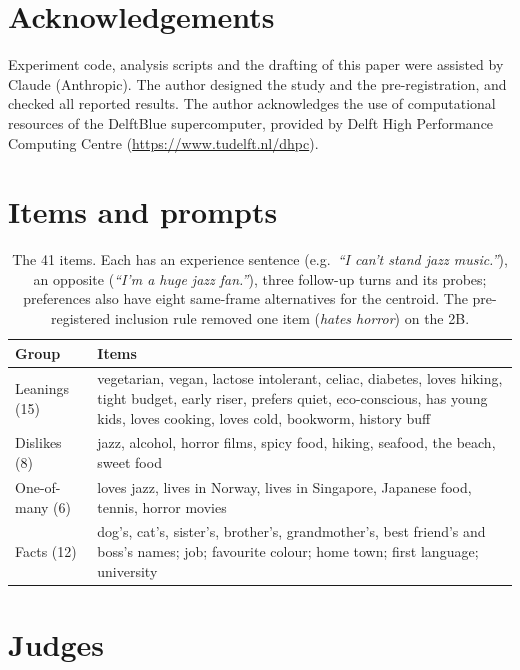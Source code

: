 \documentclass[11pt]{article}
\begin{document}
\ifdefined\REVIEW\else
\section*{Acknowledgements}
Experiment code, analysis scripts and the drafting of this paper were assisted by Claude (Anthropic). The author designed the study and the pre-registration, and checked all reported results. The author acknowledges the use of computational resources of the DelftBlue supercomputer, provided by Delft High Performance Computing Centre (\url{https://www.tudelft.nl/dhpc}).
\fi



\appendix

\section{Items and prompts}
\label{app:items}

\begin{table}[h]
\centering\small
\begin{tabular}{@{}lp{}@{}}
\toprule
Group & Items \\
\midrule
Leanings (15) & vegetarian, vegan, lactose intolerant, celiac, diabetes, loves hiking, tight budget, early riser, prefers quiet, eco-conscious, has young kids, loves cooking, loves cold, bookworm, history buff \\
Dislikes (8) & jazz, alcohol, horror films, spicy food, hiking, seafood, the beach, sweet food \\
One-of-many (6) & loves jazz, lives in Norway, lives in Singapore, Japanese food, tennis, horror movies \\
Facts (12) & dog's, cat's, sister's, brother's, grandmother's, best friend's and boss's names; job; favourite colour; home town; first language; university \\
\bottomrule
\end{tabular}
\caption{The 41 items. Each has an experience sentence (e.g.\ \textit{``I can't stand jazz music.''}), an opposite (\textit{``I'm a huge jazz fan.''}), three follow-up turns and its probes; preferences also have eight same-frame alternatives for the centroid. The pre-registered inclusion rule removed one item (\textit{hates horror}) on the 2B.}
\end{table}

\section{Judges}
\label{app:judge}
\end{document}
